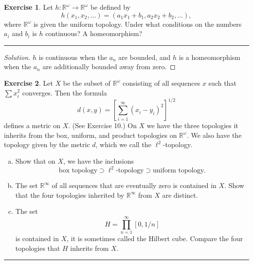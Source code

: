 \documentclass{article}
\theoremstyle{definition}
\newtheorem{exercise}{Exercise}[section]
\begin{document}
\pagebreak

\begin{exercise}
  Let $h:\mathbb{R}^\omega\to\mathbb{R}^\omega$ be defined by
  $$h(x_1,x_2,\dots) = (a_1x_1 + b_1,a_2x_2 + b_2,\dots),$$
  where $\mathbb{R}^\omega$ is given the uniform topology.
  Under what conditions on the numbers $a_i$ and $b_i$ is $h$ continuous? A homeomorphism?
\end{exercise}\hrule
\begin{proof}[Solution]
  $h$ is continuous when the $a_n$ are bounded, and $h$ is a homeomorphism when the $a_n$ are additionally bounded away from zero.
\end{proof}

\pagebreak

\begin{exercise}
  Let $X$ be the subset of $\mathbb{R}^\omega$ consisting of all sequences $x$ such that $\sum x_i^2$ converges. Then the formula
  $$d(x,y) = \left[\sum_{i=1}^{\infty} (x_i - y_i)^2\right]^{1/2}$$
  defines a metric on $X$. (See Exercise 10.) On $X$ we have the three topologies it inherits from the box, uniform, and product topologies on $\mathbb{R}^\omega$. We also have the topology given by the metric $d$, which we call the $\ell^2$-topology.
  \begin{enumerate}[(a)]
    \item Show that on $X$, we have the inclusions
    $$\text{box topology} \supset \ell^2\text{-topology}\supset\text{uniform topology}.$$
    \item The set $\mathbb{R}^\infty$ of all sequences that are eventually zero is contained in $X$. Show that the four topologies inherited by $\mathbb{R}^{\infty}$ from $X$ are distinct.
    \item The set
    $$H = \prod_{n=1}^{\infty}[0,1/n]$$
    is contained in $X$, it is sometimes called the Hilbert cube. Compare the four topologies that $H$ inherits from $X$.
  \end{enumerate}
\end{exercise}\hrule
\end{document}
